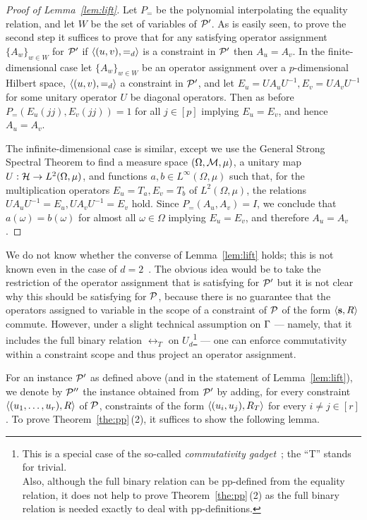 \documentclass[11pt,letter]{article}
\begin{document}
\begin{proof}[Proof of Lemma~\ref{lem:lift}]
\smallskip

Let $P_=$ be the polynomial interpolating the equality relation, and let $W$ be the set of variables of ${\mathcal P}'$. As is easily seen, to prove the second step it suffices to prove that for any satisfying operator assignment $\{A_w\}_{w\in W}$ for ${\mathcal P}'$ if $\langle (u,v),=_d \rangle$ is a constraint in ${\mathcal P}'$ then $A_u=A_v$. In the finite-dimensional case let $\{A_w\}_{w\in W}$ be an operator assignment over a $p$-dimensional Hilbert space, $\langle (u,v),=_d \rangle$ a constraint in ${\mathcal P}'$, and let $E_u=UA_uU^{-1}, E_v=UA_vU^{-1}$ for some unitary operator $U$ be diagonal operators. Then as before $P_=(E_u(jj),E_v(jj))=1$ for all $j\in[p]$ implying $E_u=E_v$, and hence $A_u=A_v$.

The infinite-dimensional case is similar, except we use the General Strong Spectral Theorem to find a measure space $(\Omega,{\mathcal M},\mu)$, a unitary map $U:{\mathcal H}\to L^2(\Omega,\mu)$, and functions $a,b\in L^\infty(\Omega,\mu)$ such
that, for the multiplication operators $E_u = T_a, E_v=T_b$ of $L^2(\Omega,\mu)$, the relations 
$U A_uU^{-1} = E_u, UA_vU^{-1}=E_v$ hold. Since $P_=(A_u,A_v)=I$, we conclude that $a(\omega)=b(\omega)$ for almost all $\omega\in\Omega$ implying $E_u=E_v$, and therefore $A_u=A_v$. 
\end{proof}

We do not know whether the converse of Lemma~\ref{lem:lift} holds; this is not known even in the case of $d=2$~\cite{AKS19:jcss}.
The obvious idea would be to take the restriction of the operator assignment
that is satisfying for ${\mathcal P}'$ but it is not clear why this should be satisfying
for ${\mathcal P}$, because there is no guarantee that the operators assigned to variable in the scope of a constraint of ${\mathcal P}$ of the form $\langle {\bf s}, R \rangle$ commute. However, under a slight technical assumption on $\Gamma$ --- namely,
that it includes the full binary relation $\rel_T$ on $U_d$\footnote{This is a special case of the
so-called \emph{commutativity gadget}~\cite{AKS19:jcss}; the ``T'' stands for
trivial.\\ Also, although the full binary relation can be pp-defined from the equality relation, it does not help to prove Theorem~\ref{the:pp}\,(2) as the full binary relation is needed exactly to deal with pp-definitions.} --- one can
enforce commutativity within a constraint scope and thus project an operator
assignment. 

For an instance ${\mathcal P}'$ as defined above (and in the statement of Lemma~\ref{lem:lift}), we denote by ${\mathcal P}''$ the instance obtained from ${\mathcal P}'$ by adding, for every constraint $\langle (u _1,\ldots, u _{r}),R \rangle$ of ${\mathcal P}$, constraints of the form $\langle (u_i,u_j),R_T \rangle$ for every $i\neq j\in [r]$.
To prove Theorem~\ref{the:pp}\,(2), it suffices to show the following lemma.
\end{document}
